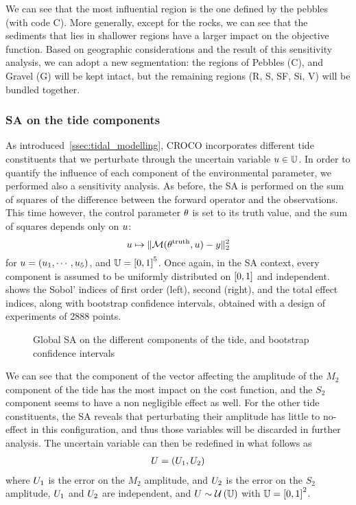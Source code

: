 \documentclass[../../Main_ManuscritThese.tex]{subfiles}
\newcommand{\CROCO}{CROCO}
\newcommand\imgpath{/home/victor/acadwriting/Manuscrit/Text/Chapter5/img/}
\begin{document}
We can see that the most influential region is the one defined by the
pebbles (with code C). More generally, except for the rocks, we can
see that the sediments that lies in shallower regions have a larger
impact on the objective function.  Based on geographic considerations
and the result of this sensitivity analysis, we can adopt a new
segmentation: the regions of Pebbles (C), and Gravel (G) will be kept
intact, but the remaining regions (R, S, SF, Si, V) will be bundled
together.
\subsubsection{SA on the tide components}
\label{ssec:SA_tide}
As introduced~\cref{ssec:tidal_modelling}, \CROCO{} incorporates
different tide constituents that we perturbate through the uncertain
variable $u\in\mathbb{U}$. In order to quantify the influence of each
component of the environmental parameter, we performed also a
sensitivity analysis. As before, the SA is performed on the sum of
squares of the difference between the forward operator and the
observations. This time however, the control parameter $\theta$ is set to its
truth value, and the sum of squares depends only on $u$:
\begin{equation}
  u \mapsto  \| \mathcal{M}(\theta^{\mathrm{truth}}, u) - y \|_2^2
\end{equation}
for $u = (u_1,\cdots,u_5)$, and $\Uspace = \interval{0}{1}^5$.
Once again, in the SA context, every component is assumed to be
uniformly distributed on $\interval{0}{1}$ and independent.
 shows the Sobol' indices of first order (left),
second (right), and the total effect indices, along with bootstrap
confidence intervals, obtained with a design of experiments of
\num{2888} points.
\begin{figure}[ht]
  \centering
  
  \caption[SA on the tide components]{\label{fig:SA_tides} Global SA
    on the different components of the tide, and bootstrap confidence
    intervals}
\end{figure}

We can see that the component of the vector affecting the amplitude of
the $M_2$ component of the tide has the most impact on the cost
function, and the $S_2$ component seems to have a non negligible
effect as well. For the other tide constituents, the SA reveals that
perturbating their amplitude has little to no-effect in this
configuration, and thus those variables will be discarded in further
analysis. The uncertain variable can then be redefined in what follows as
\begin{align}
  \UU = (\UU_1, \UU_2)%
\end{align}
where $U_1$ is the error on the $M_2$ amplitude, and $U_2$ is the
error on the $S_2$ amplitude, $U_1$ and $U_2$ are independent, and
$U \sim \mathcal{U}\left(\mathbb{U}\right)$ with
$\Uspace = \interval{0}{1}^2$.
\end{document}
